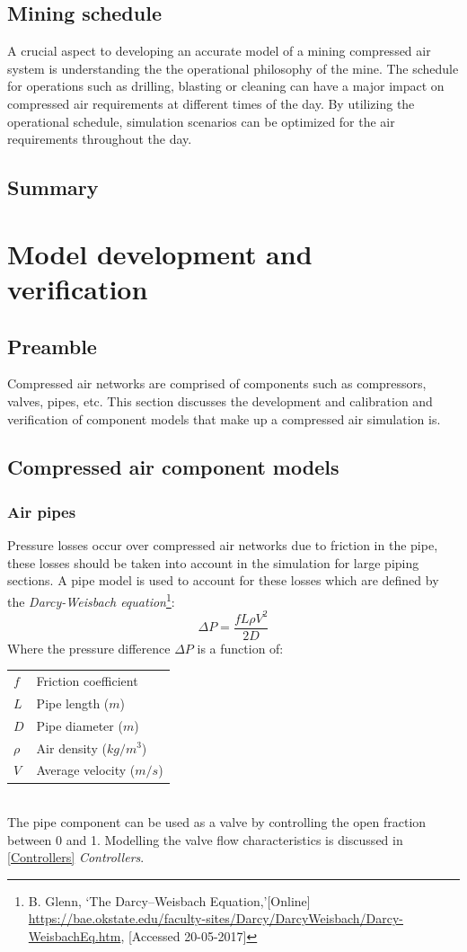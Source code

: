 	\subsection{Mining schedule}
		A crucial aspect to developing an accurate model of a mining compressed air system is understanding the the operational philosophy of the mine. The schedule for operations such as drilling,  blasting or cleaning can have a major impact on compressed air requirements at different times of the day. By utilizing the operational schedule, simulation scenarios can be optimized for the air requirements throughout the day.
	\subsection{Summary}
\section{Model development and verification}
	\subsection{Preamble}
	Compressed air networks are comprised of components such as compressors, valves, pipes, etc. This section discusses the development and calibration and verification of component models that make up a compressed air simulation is. 
	\subsection{Compressed air component models}
		\subsubsection{Air pipes}
		Pressure losses occur over compressed air networks due to friction in the pipe, these losses should be taken into account in the simulation for large piping sections. A pipe model is used to account for these losses which are defined by the \textit{Darcy-Weisbach equation}\footnote{ B. Glenn, \enquote*{The Darcy–Weisbach Equation,}[Online] \url{https://bae.okstate.edu/faculty-sites/Darcy/DarcyWeisbach/Darcy-WeisbachEq.htm}, [Accessed 20-05-2017]}:
		$$\Delta P = \frac{f  L \rho V^2}{2 D}$$
		Where the pressure difference $\Delta P $ is a function of:\\
		\begin{tabular}{p{1.3cm}p{13cm}}
		$f$ & Friction coefficient  \\
		$L$ & Pipe length ($m$) \\
		$D$ & Pipe diameter ($m$) \\
		$\rho$ & Air density ($kg/m^3$)\\	
		$V$ & Average velocity ($m/s$) \\
		\end{tabular} \\
		The pipe component can be used as a valve by controlling the open fraction between 0 and 1. Modelling the valve flow characteristics is discussed in \ref{Controllers} \textit{Controllers}.
